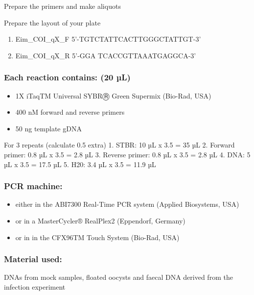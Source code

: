 \documentclass[
]{article}
\providecommand{\tightlist}{%
  \setlength{\itemsep}{0pt}\setlength{\parskip}{0pt}}
\begin{document}
Prepare the primers and make aliquots

Prepare the layout of your plate

\begin{enumerate}
\def\labelenumi{\arabic{enumi}.}
\tightlist
\item
  Eim\_COI\_qX\_F 5'-TGTCTATTCACTTGGGCTATTGT-3'
\item
  Eim\_COI\_qX\_R 5'-GGA TCACCGTTAAATGAGGCA-3'
\end{enumerate}

\hypertarget{each-reaction-contains-20-uxb5l}{%
\subsubsection{Each reaction contains: (20
µL)}\label{each-reaction-contains-20-uxb5l}}

\begin{itemize}
\tightlist
\item
  1X iTaqTM Universal SYBRⓇ Green Supermix (Bio-Rad, USA)
\item
  400 nM forward and reverse primers
\item
  50 ng template gDNA
\end{itemize}

For 3 repeats (calculate 0.5 extra) 1. STBR: 10 µL x 3.5 = 35 µL 2.
Forward primer: 0.8 µL x 3.5 = 2.8 µL 3. Reverse primer: 0.8 µL x 3.5 =
2.8 µL 4. DNA: 5 µL x 3.5 = 17.5 µL 5. H20: 3.4 µL x 3.5 = 11.9 µL

\hypertarget{pcr-machine}{%
\subsubsection{PCR machine:}\label{pcr-machine}}

\begin{itemize}
\tightlist
\item
  either in the ABI7300 Real-Time PCR system (Applied Biosystems, USA)
\item
  or in a MasterCycler® RealPlex2 (Eppendorf, Germany)
\item
  or in in the CFX96TM Touch System (Bio-Rad, USA)
\end{itemize}

\hypertarget{material-used}{%
\subsubsection{Material used:}\label{material-used}}

DNAs from mock samples, floated oocysts and faecal DNA derived from the
infection experiment
\end{document}
